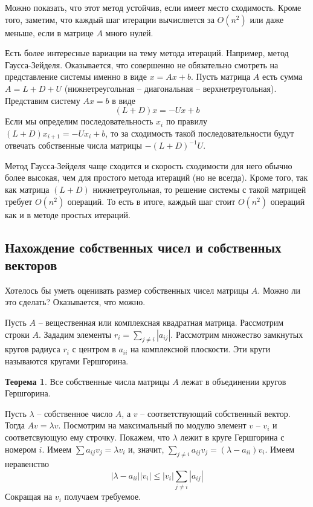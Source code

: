 \documentclass[12pt,a4paper,oneside]{book}
\theoremstyle{definition}
\newtheorem{thm}{\color{red!40!black}Теорема}
\renewcommand{\leq}{\leqslant}
\def\thrm{\begin{thm}}
\def\ethrm{\end{thm}}
\begin{document}
Можно показать, что этот метод устойчив, если имеет место сходимость. Кроме того, заметим, что каждый шаг итерации вычисляется за $O(n^2)$ или даже меньше, если в матрице $A$ много нулей.

Есть более интересные вариации на тему метода итераций. Например, метод Гаусса-Зейделя. Оказывается, что совершенно не обязательно смотреть на представление системы именно в виде $x=Ax+b$. Пусть матрица $A$ есть сумма $A=L+D+U$ (нижнетреугольная -- диагональная -- верхнетреугольная). Представим систему $Ax=b$ в виде 
$$(L+D)x=-Ux+b$$
Если мы определим последовательность $x_i$ по правилу $(L+D)x_{i+1}=-Ux_i+b$, то за сходимость такой последовательности будут отвечать собственные числа матрицы $-(L+D)^{-1}U$. 

Метод Гаусса-Зейделя чаще сходится и скорость сходимости для него обычно более высокая, чем для простого метода итераций (но не всегда). Кроме того, так как матрица $(L+D)$ нижнетреугольная, то решение системы с такой матрицей требует $O(n^2)$ операций. То есть в итоге, каждый шаг стоит $O(n^2)$ операций как и в методе простых итераций.







\subsection{Нахождение собственных чисел и собственных векторов}

Хотелось бы уметь оценивать размер собственных чисел матрицы $A$. Можно ли это сделать? Оказывается, что можно. 


Пусть $A$ -- вещественная или комплексная квадратная матрица. Рассмотрим строки $A$. Зададим элементы $r_i=\sum_{j\neq i} |a_{ij}|$. Рассмотрим множество замкнутых кругов радиуса $r_i$ с центром в $a_{ii}$ на комплексной плоскости. Эти круги называются кругами Гершгорина. 

\thrm Все собственные числа матрицы $A$ лежат в объединении кругов Гершгорина. 
\ethrm
\proof Пусть $\lambda$ -- собственное число $A$, а $v$ -- соответствующий собственный вектор. Тогда $Av=\lambda v$. Посмотрим на максимальный по модулю элемент $v$ -- $v_i$ и соответсвующую ему строчку. Покажем, что $\lambda$ лежит в круге Гершгорина с номером $i$. Имеем $\sum a_{ij}v_j =\lambda v_i$  и, значит, $\sum_{j\neq i} a_{ij}v_j= (\lambda - a_{ii})v_i $. Имеем неравенство $$|\lambda -a_{ii}||v_i| \leq |v_i|\sum_{j\neq i} |a_{ij}|$$
Сокращая на $v_i$ получаем требуемое. 
\endproof
\end{document}
